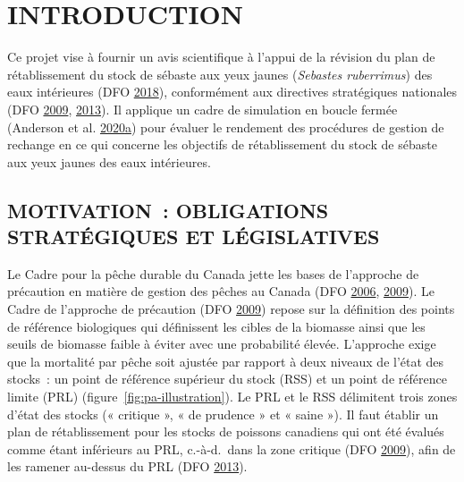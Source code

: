 \documentclass[11pt]{book}
\begin{document}
\frontmatter

\clearpage

\hypertarget{sec:introduction}{%
\section{INTRODUCTION}\label{sec:introduction}}

Ce projet vise à fournir un avis scientifique à l'appui de la révision du plan de rétablissement du stock de sébaste aux yeux jaunes (\emph{Sebastes ruberrimus}) des eaux intérieures (DFO \protect\hyperlink{ref-ifmp2018}{2018}), conformément aux directives stratégiques nationales (DFO \protect\hyperlink{ref-dfo2009}{2009}, \protect\hyperlink{ref-dfo2013}{2013}). Il applique un cadre de simulation en boucle fermée (Anderson et al. \protect\hyperlink{ref-anderson2020gfmp}{2020}\protect\hyperlink{ref-anderson2020gfmp}{a}) pour évaluer le rendement des procédures de gestion de rechange en ce qui concerne les objectifs de rétablissement du stock de sébaste aux yeux jaunes des eaux intérieures.

\hypertarget{sec:introduction-motivation}{%
\subsection{MOTIVATION~: OBLIGATIONS STRATÉGIQUES ET LÉGISLATIVES}\label{sec:introduction-motivation}}

Le Cadre pour la pêche durable du Canada jette les bases de l'approche de précaution en matière de gestion des pêches au Canada (DFO \protect\hyperlink{ref-dfo2006}{2006}, \protect\hyperlink{ref-dfo2009}{2009}). Le Cadre de l'approche de précaution (DFO \protect\hyperlink{ref-dfo2009}{2009}) repose sur la définition des points de référence biologiques qui définissent les cibles de la biomasse ainsi que les seuils de biomasse faible à éviter avec une probabilité élevée. L'approche exige que la mortalité par pêche soit ajustée par rapport à deux niveaux de l'état des stocks~: un point de référence supérieur du stock (RSS) et un point de référence limite (PRL) (figure~\ref{fig:pa-illustration}). Le PRL et le RSS délimitent trois zones d'état des stocks (« critique », « de prudence » et « saine »). Il faut établir un plan de rétablissement pour les stocks de poissons canadiens qui ont été évalués comme étant inférieurs au PRL, c.-à-d.~dans la zone critique (DFO \protect\hyperlink{ref-dfo2009}{2009}), afin de les ramener au-dessus du PRL (DFO \protect\hyperlink{ref-dfo2013}{2013}).
\end{document}
